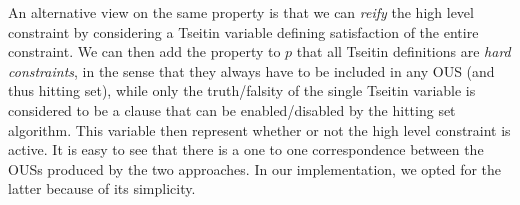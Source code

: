 An alternative view on the same property is that we can \emph{reify} the high level constraint by considering a Tseitin variable defining satisfaction of the entire constraint. 
We can then add the property to $p$ that all Tseitin definitions are \emph{hard constraints}, in the sense that they always have to be included in any OUS (and thus hitting set), while only the truth/falsity of the single Tseitin variable is considered to be a clause that can be enabled/disabled by the hitting set algorithm. 
This variable then represent whether or not the high level constraint is active.
It is easy to see that there is a one to one correspondence between the OUSs produced by the two approaches. In our implementation, we opted for the latter because of its simplicity. 
 
